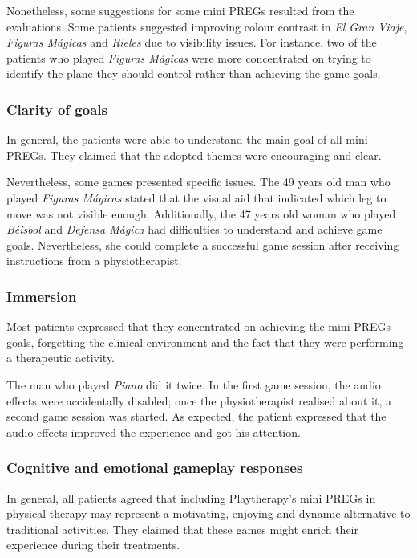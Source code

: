 Nonetheless, some suggestions for some mini \acp{PREG} resulted from the evaluations. Some patients suggested improving colour contrast in \textit{El Gran Viaje}, \textit{Figuras M\'agicas} and \textit{Rieles} due to visibility issues. For instance, two of the patients who played \textit{Figuras M\'agicas} were more concentrated on trying to identify the plane they should control rather than achieving the game goals.

\subsubsection*{Clarity of goals}
In general, the patients were able to understand the main goal of all mini \acp{PREG}. They claimed that the adopted themes were encouraging and clear.

Nevertheless, some games presented specific issues. The 49 years old man who played \textit{Figuras M\'agicas} stated that the visual aid that indicated which leg to move was not visible enough. Additionally, the 47 years old woman who played \textit{B\'eisbol} and \textit{Defensa M\'agica} had difficulties to understand and achieve game goals. Nevertheless, she could complete a successful game session after receiving instructions from a physiotherapist.

\subsubsection*{Immersion}
Most patients expressed that they concentrated on achieving the mini \acp{PREG} goals, forgetting the clinical environment and the fact that they were performing a therapeutic activity.

The man who played \textit{Piano} did it twice. In the first game session, the audio effects were accidentally disabled; once the physiotherapist realised about it, a second game session was started. As expected, the patient expressed that the audio effects improved the experience and got his attention.

\subsubsection{Cognitive and emotional gameplay responses}
In general, all patients agreed that including Playtherapy's mini \acp{PREG} in physical therapy may represent a motivating, enjoying and dynamic alternative to traditional activities. They claimed that these games might enrich their experience during their treatments.

